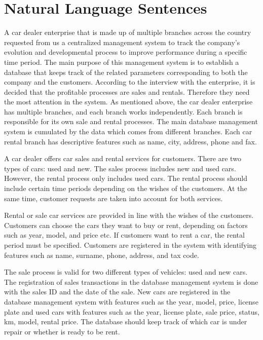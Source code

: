 \newpage
\section{Natural Language Sentences}
A car dealer enterprise that is made up of multiple branches across the country requested from us a centralized 
management system to track the company’s evolution and developmental process to improve performance during a 
specific time period. The main purpose of this management system is to establish a database that keeps track of 
the related parameters corresponding to both the company and the customers. According to the interview with the 
enterprise, it is decided that the profitable processes are sales and rentals. Therefore they 
need the most attention in the system. As mentioned above, the car dealer enterprise has multiple branches, 
and each branch works independently. Each branch is responsible for its own sale and rental processes. 
The main database management system is cumulated by the data which comes from different branches. 
Each car rental branch has descriptive features such as name, city, address, phone and fax.

\medskip

\noindent A car dealer offers car sales and rental services for customers. There are two types of cars: used and new. 
The sales process includes new and used cars. However, the rental process only includes used cars. The rental 
process should include certain time periods depending on the wishes of the customers. At the same time, customer 
requests are taken into account for both services.

\medskip

\noindent Rental or sale car services are provided in line with the wishes of the customers. Customers can choose 
the cars they want to buy or rent, depending on factors such as year, model, and price etc. If customers 
want to rent a car, the rental period must be specified. Customers are registered in the system with identifying 
features such as name, surname, phone, address, and tax code.

\medskip

\noindent The sale process is valid for two different types of vehicles: used and new cars. The registration of sales transactions
in the database management system is done with the sales ID and the date of the sale. New cars are registered in the database
management system with features such as the year, model, price, license plate and used cars with features such as the year, 
license plate, sale price, status, km, model, rental price. The database should keep track of which car is under repair or 
whether is ready to be rent.

